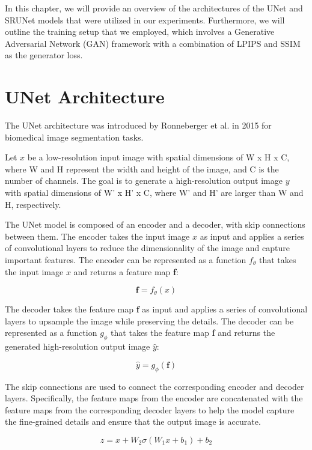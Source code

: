 \label{chap:Architectures}

In this chapter, we will provide an overview of the architectures of the UNet and SRUNet models that were utilized in our experiments. Furthermore, we will outline the training setup that we employed, which involves a Generative Adversarial Network (GAN) framework with a combination of LPIPS and SSIM as the generator loss.

\section{UNet Architecture}
\label{sec:unet}

The UNet architecture was introduced by Ronneberger et al. \cite{ronneberger2015u} in 2015 for biomedical image segmentation tasks.

Let $x$ be a low-resolution input image with spatial dimensions of W x H x C, where W and H represent the width and height of the image, and C is the number of channels. The goal is to generate a high-resolution output image $y$ with spatial dimensions of W' x H' x C, where W' and H' are larger than W and H, respectively.

The UNet model is composed of an encoder and a decoder, with skip connections between them. The encoder takes the input image $x$ as input and applies a series of convolutional layers to reduce the dimensionality of the image and capture important features. The encoder can be represented as a function $f_\theta$ that takes the input image $x$ and returns a feature map \textbf{f}:

$$ \textbf{f} = f_\theta(x) $$

The decoder takes the feature map \textbf{f} as input and applies a series of convolutional layers to upsample the image while preserving the details. The decoder can be represented as a function $g_\phi$ that takes the feature map \textbf{f} and returns the generated high-resolution output image $\hat{y}$:

$$ \hat{y} = g_\phi(\textbf{f}) $$

The skip connections are used to connect the corresponding encoder and decoder layers. Specifically, the feature maps from the encoder are concatenated with the feature maps from the corresponding decoder layers to help the model capture the fine-grained details and ensure that the output image is accurate.

$$ z = x + W_2\sigma(W_1 x + b_1) + b_2 $$

